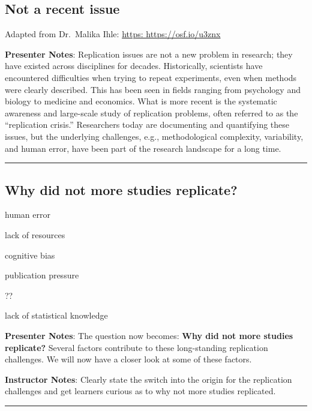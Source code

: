 \documentclass[
  english,
  letterpaper,
  DIV=11,
  numbers=noendperiod]{scrartcl}
\begin{document}
\subsection{Not a recent issue}\label{not-a-recent-issue}

Adapted from Dr.~Malika Ihle: \href{https://osf.io/u3znx}{https:
https://osf.io/u3znx}

\textbf{Presenter Notes}: Replication issues are not a new problem in
research; they have existed across disciplines for decades.
Historically, scientists have encountered difficulties when trying to
repeat experiments, even when methods were clearly described. This has
been seen in fields ranging from psychology and biology to medicine and
economics. What is more recent is the systematic awareness and
large-scale study of replication problems, often referred to as the
``replication crisis.'' Researchers today are documenting and
quantifying these issues, but the underlying challenges, e.g.,
methodological complexity, variability, and human error, have been part
of the research landscape for a long time.

\begin{center}\rule{0.5\linewidth}{0.5pt}\end{center}

\subsection{Why did not more studies
replicate?}\label{why-did-not-more-studies-replicate}

human error

lack of resources

cognitive bias

publication pressure

??

lack of statistical knowledge

\textbf{Presenter Notes}: The question now becomes: \textbf{Why did not
more studies replicate?} Several factors contribute to these
long-standing replication challenges. We will now have a closer look at
some of these factors.

\textbf{Instructor Notes}: Clearly state the switch into the origin for
the replication challenges and get learners curious as to why not more
studies replicated.

\begin{center}\rule{0.5\linewidth}{0.5pt}\end{center}
\end{document}
